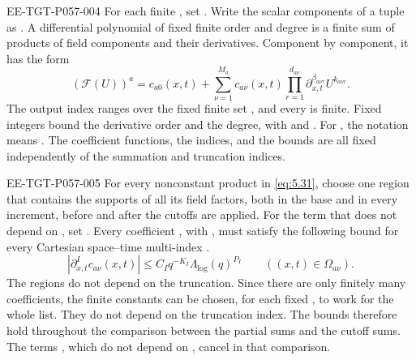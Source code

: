 \begin{EESegment}{EE-TGT-P057-004}
For each finite , set
. Write the scalar components of a tuple as
. A differential polynomial of fixed finite order and degree is a finite
sum of products of field components and their derivatives. Component by component, it has the form
\begin{equation}
 (\mathcal F(U))^a=c_{a0}(x,t)
 +\sum_{\nu=1}^{M_a}c_{a\nu}(x,t)
 \prod_{r=1}^{d_{a\nu}}\partial_{x,t}^{\beta_{a\nu r}}U^{k_{a\nu r}}.
 \tag{5.31}\label{eq:5.31}
\end{equation}
The output index ranges over the fixed finite set , and every
 is finite. Fixed integers  bound the derivative order and
the degree, with  and
. For
, the notation means
. The coefficient functions, the indices,
and the bounds  are all fixed independently of the summation and truncation indices.
\end{EESegment}

\begin{EESegment}{EE-TGT-P057-005}
For every nonconstant product in \eqref{eq:5.31}, choose one region
 that contains the supports of all its field factors, both in the base and in every
increment, before and after the cutoffs are applied. For the term that does not depend on
, set . Every coefficient
, with , must satisfy the following bound for
every Cartesian space--time multi-index .
\begin{equation}
 |\partial_{x,t}^{I}c_{a\nu}(x,t)|
 \leq C_Iq^{-K_I}\Lambda_{\log}(q)^{P_I}
 \qquad ((x,t)\in\Omega_{a\nu}).
 \tag{5.32}\label{eq:5.32}
\end{equation}
The regions do not depend on the truncation. Since there are only finitely many coefficients, the finite constants
 can be chosen, for each fixed , to work for the whole list.
They do not depend on the truncation index. The bounds therefore hold throughout the comparison between the partial sums
and the cutoff sums. The terms , which do not depend on
, cancel in that comparison.
\end{EESegment}

